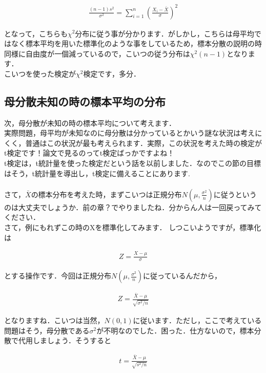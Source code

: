 \documentclass[11pt,a4paper,uplatex]{ujreport} 	%
\begin{document}
\begin{align}
  \frac{(n-1)s^2}{\sigma^2} =\sum_{i=1}^n (\frac{X_i-\bar{X}}{\sigma})^2
\end{align}

となって，こちらも$\chi^2$分布に従う事が分かります．がしかし，こちらは母平均ではなく標本平均を用いた標準化のような事をしているため，標本分散の説明の時同様に自由度が一個減っているので，こいつの従う分布は$\chi^2(n-1)$となります．\\

こいつを使った検定が$\chi^2$検定です，多分．

\subsection{母分散未知の時の標本平均の分布}
次，母分散が未知の時の標本平均について考えます．\\

実際問題，母平均が未知なのに母分散は分かっているとかいう謎な状況は考えにくく，普通はこの状況が最も考えられます．実際，この状況を考えた時の検定がt検定です！論文で見るのってt検定ばっかですよね！\\

t検定は，t統計量を使った検定だという話を以前しました．なのでこの節の目標はそう，t統計量を導出し，t検定に備えることにあります.\\\\

さて，$\bar{X}$の標本分布を考えた時，まずこいつは正規分布$N(\mu, \frac{\sigma^2}{n})$に従うというのは大丈夫でしょうか．前の章？でやりましたね．分からん人は一回戻ってみてください．\\

さて，例にもれずこの時のXを標準化してみます．
しつこいようですが，標準化は

\begin{align}
  Z = \frac{X-\mu}{\sigma}
\end{align}

とする操作です．今回は正規分布$N(\mu, \frac{\sigma^2}{n})$に従っているんだから，

\begin{align}
  Z = \frac{\bar{X} - \mu}{\sqrt{\sigma^2/n}}
\end{align}

となりますね．こいつは当然，$N(0,1)$に従います．ただし，ここで考えている問題はそう，母分散である$\sigma^2$が不明なのでした．困った．仕方ないので，標本分散で代用しましょう．そうすると

\begin{align}
  t = \frac{\bar{X}- \mu}{\sqrt{s^2/n}}
  \label{eq:t-value}
\end{align}
\end{document}
